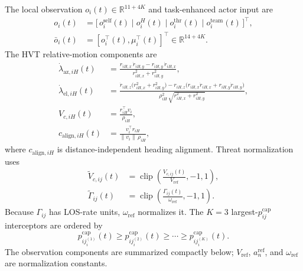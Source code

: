 \documentclass{cja}
\begin{document}
The local observation $o_i(t)\in\mathbb R^{11+4K}$ and task-enhanced actor input are
\begin{equation}
\begin{aligned}
o_i(t)
&=\bigl[\,o_i^{\mathrm{self}}(t)\mid o_i^{H}(t)\mid
o_i^{\mathrm{thr}}(t)\mid o_i^{\mathrm{team}}(t)\,\bigr]^\top,\\
\bar o_i(t)
&=\left[o_i^\top(t),\mu_i^\top(t)\right]^\top
\in\mathbb R^{14+4K}.
\end{aligned}
\label{eq:obs-decomp}
\end{equation}
The HVT relative-motion components are
\begin{align}
\dot\lambda_{\mathrm{az},iH}(t)&=\frac{r_{iH,x}\,\dot r_{iH,y}-r_{iH,y}\,\dot r_{iH,x}}{r_{iH,x}^{2}+r_{iH,y}^{2}},
\label{eq:los-az}\\
\dot\lambda_{\mathrm{el},iH}(t)&=\frac{\dot r_{iH,z}\bigl(r_{iH,x}^{2}+r_{iH,y}^{2}\bigr)
-r_{iH,z}\bigl(r_{iH,x}\dot r_{iH,x}+r_{iH,y}\dot r_{iH,y}\bigr)}{\rho_{iH}^{2}\,\sqrt{r_{iH,x}^{2}+r_{iH,y}^{2}}},
\label{eq:los-el}\\
V_{c,iH}(t)&=\frac{r_{iH}^{\top}v_i}{\rho_{iH}},
\label{eq:vc-h}\\
c_{\mathrm{align},iH}(t)&=\frac{v_i^{\top}r_{iH}}{\|v_i\|\,\rho_{iH}},
\label{eq:cos-align}
\end{align}
where $c_{\mathrm{align},iH}$ is distance-independent heading alignment. Threat normalization uses
\begin{equation}
\begin{aligned}
\widetilde V_{c,ij}(t)
&=\operatorname{clip}\!\left(\frac{V_{c,ij}(t)}{V_{\mathrm{ref}}},-1,1\right),\\
\widetilde\Gamma_{ij}(t)
&=\operatorname{clip}\!\left(\frac{\Gamma_{ij}(t)}{\omega_{\mathrm{ref}}},-1,1\right).
\end{aligned}
\end{equation}
Because $\Gamma_{ij}$ has LOS-rate units, $\omega_{\mathrm{ref}}$ normalizes it. The $K=3$ largest-$p_{ij}^{\mathrm{cap}}$ interceptors are ordered by
\begin{equation}
p_{i j_i^{(1)}}^{\mathrm{cap}}(t)
\ge p_{i j_i^{(2)}}^{\mathrm{cap}}(t)
\ge\cdots\ge
p_{i j_i^{(K)}}^{\mathrm{cap}}(t).
\end{equation}
The observation components are summarized compactly below; $V_{\mathrm{ref}}$, $a^{\mathrm{ref}}_n$, and $\omega_{\mathrm{ref}}$ are normalization constants.
\end{document}

